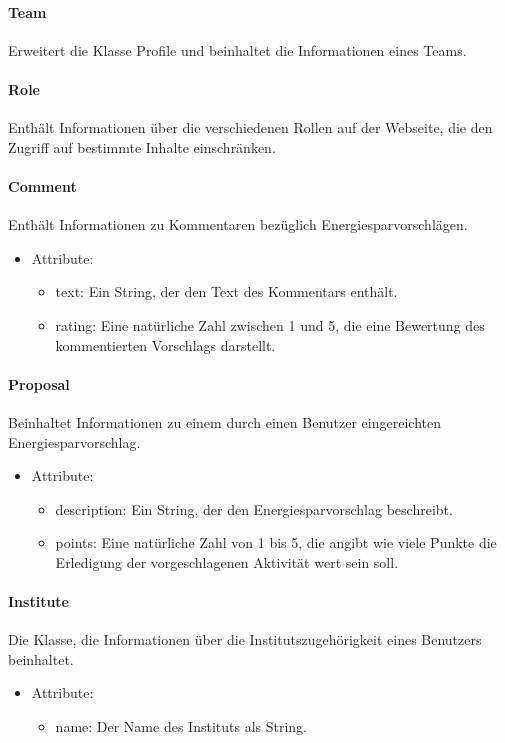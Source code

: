 	\paragraph{Team}Erweitert die Klasse Profile und beinhaltet die Informationen eines Teams.
	\paragraph{Role}Enth\"alt Informationen \"uber die verschiedenen Rollen auf der Webseite, die den Zugriff auf bestimmte Inhalte einschr\"anken.
	\paragraph{Comment}Enth\"alt Informationen zu Kommentaren bez\"uglich Energiesparvorschl\"agen.
		\begin{itemize}
			\item Attribute:
			\begin{itemize}
				\item text: Ein String, der den Text des Kommentars enth\"alt.
				\item rating: Eine nat\"urliche Zahl zwischen 1 und 5, die eine Bewertung des kommentierten Vorschlags darstellt.
			\end{itemize}
		\end{itemize}
	\paragraph{Proposal}Beinhaltet Informationen zu einem durch einen Benutzer eingereichten Energiesparvorschlag.
		\begin{itemize}
			\item Attribute:
			\begin{itemize}
				\item description: Ein String, der den Energiesparvorschlag beschreibt.
				\item points: Eine nat\"urliche Zahl von 1 bis 5, die angibt wie viele Punkte die Erledigung der vorgeschlagenen Aktivit\"at wert sein soll.
			\end{itemize}
		\end{itemize}
	\paragraph{Institute}Die Klasse, die Informationen \"uber die Institutszugeh\"origkeit eines Benutzers beinhaltet.
		\begin{itemize}
			\item Attribute:
			\begin{itemize}
				\item name: Der Name des Instituts als String.
			\end{itemize}
		\end{itemize}
